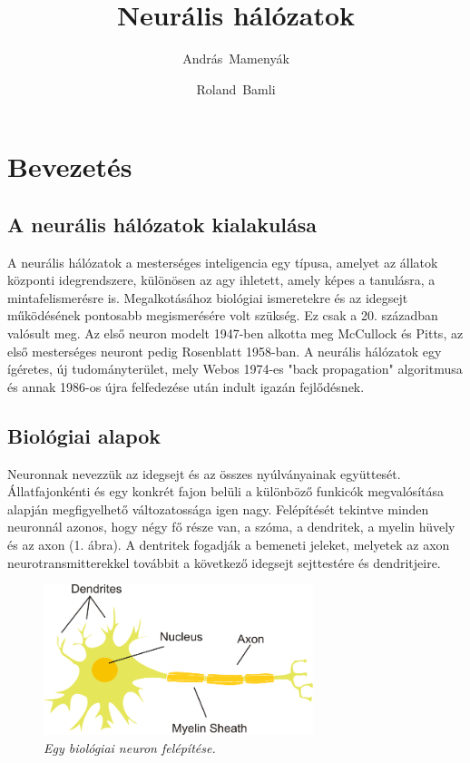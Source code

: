 \documentclass[a4paper]{article}
\author{Andr\'as~Mameny\'ak}
\author{Roland~Bamli}
\affil{Mérnök informatikus szak (BSc), Debreceni Egyetem}
\title{Neurális hálózatok}
\begin{document}
\maketitle

\section{Bevezetés}
\subsection{A neurális hálózatok kialakulása}
A neurális hálózatok a mesterséges inteligencia egy típusa, amelyet az állatok központi idegrendszere, különösen az agy ihletett, amely képes a tanulásra, a mintafelismerésre is. Megalkotásához biológiai ismeretekre és az idegsejt működésének pontosabb megismerésére volt szükség. Ez csak a 20. században valósult meg. Az első neuron modelt 1947-ben alkotta meg McCullock és Pitts, az első mesterséges neuront pedig Rosenblatt 1958-ban. A neurális hálózatok egy ígéretes, új tudományterület, mely Webos 1974-es "back propagation" algoritmusa és annak 1986-os újra felfedezése után indult igazán fejlődésnek.

\subsection{Biológiai alapok}
Neuronnak nevezzük az idegsejt és az összes nyúlványainak együttesét.  
Állatfajonkénti és egy konkrét fajon belüli a különböző funkicók megvalósítása alapján megfigyelhető változatossága igen nagy. Felépítését tekintve minden neuronnál azonos, hogy négy fő része van,  a szóma, a dendritek, a myelin hüvely és az axon (1. ábra). A dentritek fogadják a bemeneti jeleket, melyetek az axon neurotransmitterekkel továbbit a következő idegsejt sejttestére és dendritjeire.

\begin{figure}[hb]
  \centering
  \includegraphics[width=0.7\textwidth]{neuron}
  \caption{\textit{Egy biológiai neuron felépítése.}}
\end{figure}
\end{document}
